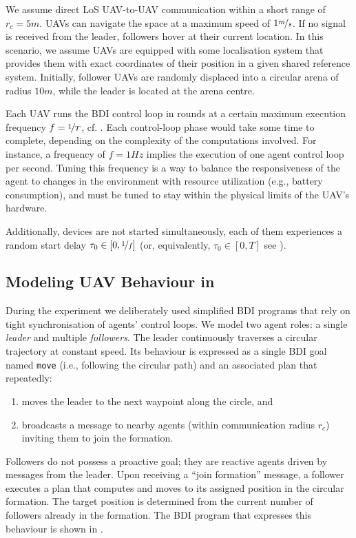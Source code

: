 We assume direct \ac{LoS} \ac{UAV}-to-\ac{UAV} communication within a short range of $r_c=5m$.
%
\acp{UAV} can navigate the space at a maximum speed of $1\nicefrac{m}{s}$.
%
If no signal is received from the leader, followers hover at their current location.
%
In this scenario, we assume \acp{UAV} are equipped with some localisation system that provides them with exact coordinates of their position in a given shared reference system.
%
Initially,
follower \acp{UAV} are randomly displaced into a circular arena of radius $10m$,
while the leader is located at the arena centre.

Each \ac{UAV} runs the \ac{BDI} control loop in rounds
at a certain maximum execution frequency
$f = \nicefrac{1}{T}$, cf. .
%
Each control-loop phase would take some time to complete, depending on the complexity of the computations involved.
%
For instance, a frequency of $f=1Hz$ implies the execution
    of one agent control loop per second.
Tuning this frequency is a way to balance the responsiveness of the agent to changes in the
    environment with resource utilization (e.g., battery consumption),
and must be tuned to stay within the physical limits of the \ac{UAV}'s hardware.

Additionally,
devices are not started simultaneously,
each of them experiences a random start delay $\tau_0 \in [0, \nicefrac{1}{f}]$
    (or, equivalently, $\tau_0 \in [0, T]$ see ).

\subsection{Modeling \ac{UAV} Behaviour in \jakta{}}
\label{ssec:bdi-behaviour}

During the experiment we deliberately used simplified \ac{BDI} programs that rely on tight synchronisation of agents' control loops.
%
We model two agent roles: a single \emph{leader} and multiple \emph{followers}.
%
The leader continuously traverses a circular trajectory at constant speed.
%
Its behaviour is expressed as a single \ac{BDI} goal named \texttt{move}
(i.e., following the circular path)
and an associated plan that repeatedly:
\begin{enumerate}
    \item moves the leader to the next waypoint along the circle, and
    \item broadcasts a message to nearby agents (within communication radius $r_c$) inviting them to join the formation.
\end{enumerate}
%
Followers do not possess a proactive goal;
they are reactive agents driven by messages from the leader.
%
Upon receiving a ``join formation'' message,
a follower executes a plan that computes and moves to its assigned position in the circular formation.
%
The target position is determined from the current number
of followers already in the formation.
%
The \ac{BDI} program that expresses this behaviour is shown in .

